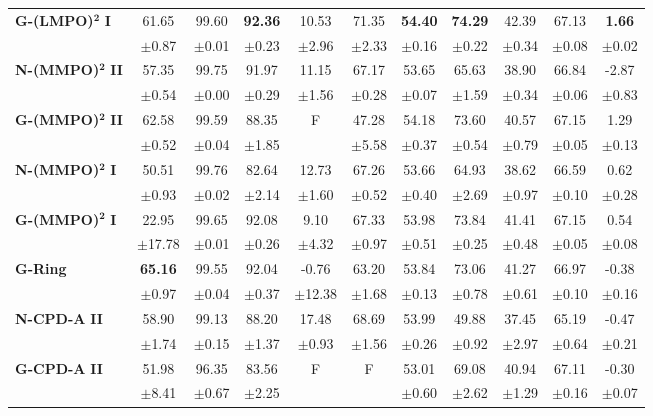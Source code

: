 \begin{table}[ht]
\begin{tabular}{lcccccccccc}
\midrule
\textbf{G-(LMPO)}$\bm{^2}$ \textbf{I} & 61.65 & 99.60 & \textbf{92.36} & 10.53 & 71.35 & \textbf{54.40} & \textbf{74.29} & 42.39 & 67.13 & \textbf{1.66} \\
 & $\pm$0.87 & $\pm$0.01 & $\pm$0.23 & $\pm$2.96 & $\pm$2.33 & $\pm$0.16 & $\pm$0.22 & $\pm$0.34 & $\pm$0.08 & $\pm$0.02 \\
\midrule
\textbf{N-(MMPO)}$\bm{^2}$ \textbf{II} & 57.35 & 99.75 & 91.97 & 11.15 & 67.17 & 53.65 & 65.63 & 38.90 & 66.84 & -2.87 \\
 & $\pm$0.54 & $\pm$0.00 & $\pm$0.29 & $\pm$1.56 & $\pm$0.28 & $\pm$0.07 & $\pm$1.59 & $\pm$0.34 & $\pm$0.06 & $\pm$0.83 \\
\midrule
\textbf{G-(MMPO)}$\bm{^2}$ \textbf{II} & 62.58 & 99.59 & 88.35 & F & 47.28 & 54.18 & 73.60 & 40.57 & 67.15 & 1.29 \\
 & $\pm$0.52 & $\pm$0.04 & $\pm$1.85 &  & $\pm$5.58 & $\pm$0.37 & $\pm$0.54 & $\pm$0.79 & $\pm$0.05 & $\pm$0.13 \\
\midrule
\textbf{N-(MMPO)}$\bm{^2}$ \textbf{I} & 50.51 & 99.76 & 82.64 & 12.73 & 67.26 & 53.66 & 64.93 & 38.62 & 66.59 & 0.62 \\
 & $\pm$0.93 & $\pm$0.02 & $\pm$2.14 & $\pm$1.60 & $\pm$0.52 & $\pm$0.40 & $\pm$2.69 & $\pm$0.97 & $\pm$0.10 & $\pm$0.28 \\
\midrule
\textbf{G-(MMPO)}$\bm{^2}$ \textbf{I} & 22.95 & 99.65 & 92.08 & 9.10 & 67.33 & 53.98 & 73.84 & 41.41 & 67.15 & 0.54 \\
 & $\pm$17.78 & $\pm$0.01 & $\pm$0.26 & $\pm$4.32 & $\pm$0.97 & $\pm$0.51 & $\pm$0.25 & $\pm$0.48 & $\pm$0.05 & $\pm$0.08 \\
\midrule
\textbf{G-Ring} & \textbf{65.16} & 99.55 & 92.04 & -0.76 & 63.20 & 53.84 & 73.06 & 41.27 & 66.97 & -0.38 \\
 & $\pm$0.97 & $\pm$0.04 & $\pm$0.37 & $\pm$12.38 & $\pm$1.68 & $\pm$0.13 & $\pm$0.78 & $\pm$0.61 & $\pm$0.10 & $\pm$0.16 \\
\midrule
\midrule
\textbf{N-CPD-A} \textbf{II} & 58.90 & 99.13 & 88.20 & 17.48 & 68.69 & 53.99 & 49.88 & 37.45 & 65.19 & -0.47 \\
 & $\pm$1.74 & $\pm$0.15 & $\pm$1.37 & $\pm$0.93 & $\pm$1.56 & $\pm$0.26 & $\pm$0.92 & $\pm$2.97 & $\pm$0.64 & $\pm$0.21 \\
\midrule
\textbf{G-CPD-A} \textbf{II} & 51.98 & 96.35 & 83.56 & F & F & 53.01 & 69.08 & 40.94 & 67.11 & -0.30 \\
 & $\pm$8.41 & $\pm$0.67 & $\pm$2.25 &  &  & $\pm$0.60 & $\pm$2.62 & $\pm$1.29 & $\pm$0.16 & $\pm$0.07 \\

\end{tabular}
\end{table}
